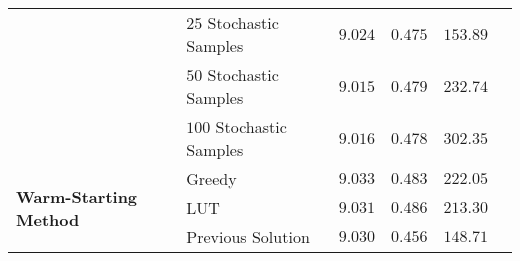 \begin{tabular}{l|lllll}
 & $25$ Stochastic Samples & $9.024$ \cellcolor[gray]{0.6} & $0.475$ \cellcolor[gray]{0.767} & $153.89$ \cellcolor[gray]{0.667}  \\ 
 & $50$ Stochastic Samples & $9.015$ \cellcolor[gray]{0.767} & $0.479$ \cellcolor[gray]{0.7} & $232.74$ \cellcolor[gray]{0.567}  \\ 
 & $100$ Stochastic Samples & $9.016$  \cellcolor[gray]{0.733} & $0.478$ \cellcolor[gray]{0.733} & $302.35$ \cellcolor[gray]{0.467}  \\ \hline 
\multirow{3}{*}{\textbf{Warm-Starting Method}} & Greedy & $9.033$ \cellcolor[gray]{0.467} & $0.483$ \cellcolor[gray]{0.633} & $222.05$ \cellcolor[gray]{0.6} \\ 
 & LUT & $9.031$ \cellcolor[gray]{0.5} & $0.486$ \cellcolor[gray]{0.567} & $213.30$ \cellcolor[gray]{0.633}  \\ 
 & Previous Solution & $9.030$  \cellcolor[gray]{0.533} & $0.456$ \cellcolor[gray]{0.867} & $148.71$ \cellcolor[gray]{0.7}  \\ \hline 
\end{tabular}